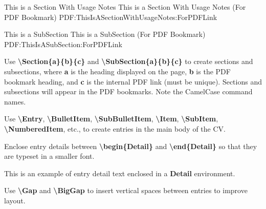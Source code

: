 \documentclass[letterpaper,MMMyyyy,nonstopmode]{simpleresumecv}
\newcommand{\Code}[1]{\mbox{\textbf{#1}}}
\newcommand{\CodeCommand}[1]{\mbox{\textbf{\textbackslash{#1}}}}
\begin{document}
\begin{Body}
\iffalse

\Section
{Languages}
{Languages}
{PDF:Languages}

\BulletItem
Russian: Mother tongue.

\Gap
\BulletItem
English: Fluent


\Section
{Skills}
{Skills}
{PDF:Skills}

\BulletItem
Machine Learning, Deep Learning, Probabilistic Machine Learning

\BulletItem
Python, Pytorch, Feel free with Linux
\fi

\iffalse

\begingroup
\color{red}

\Section
{This is a\newline
Section\newline
With\newline
Usage Notes}
{This is a Section With Usage Notes (For PDF Bookmark)}
{PDF:ThisIsASectionWithUsageNotes:ForPDFLink}

\SubSection
{This is a SubSection}
{This is a SubSection (For PDF Bookmark)}
{PDF:ThisIsASubSection:ForPDFLink}

\Gap
\BulletItem
Use \CodeCommand{Section\{a\}\{b\}\{c\}} and
\CodeCommand{SubSection\{a\}\{b\}\{c\}}
to create sections and subsections, where
\Code{a} is the heading displayed on the page,
\Code{b} is the PDF bookmark heading, and
\Code{c} is the internal PDF link (must be unique).
Sections and subsections will appear in the PDF bookmarks.
Note the CamelCase command names.

\Gap
\BulletItem
Use
\CodeCommand{Entry},
\CodeCommand{BulletItem},
\CodeCommand{SubBulletItem},
\CodeCommand{Item},
\CodeCommand{SubItem},
\CodeCommand{NumberedItem},
etc.,
to create entries in the main body of the CV.

\Gap
\BulletItem
Enclose entry details between
\CodeCommand{begin\{Detail\}} and
\CodeCommand{end\{Detail\}}
so that they are typeset in a smaller font.
\begin{Detail}
\Item
This is an example of entry detail text enclosed in a \Code{Detail} environment.
\end{Detail}

\Gap
\BulletItem
Use \CodeCommand{Gap} and \CodeCommand{BigGap} to insert vertical spaces between entries to improve layout.


\end{Body}
\end{document}
